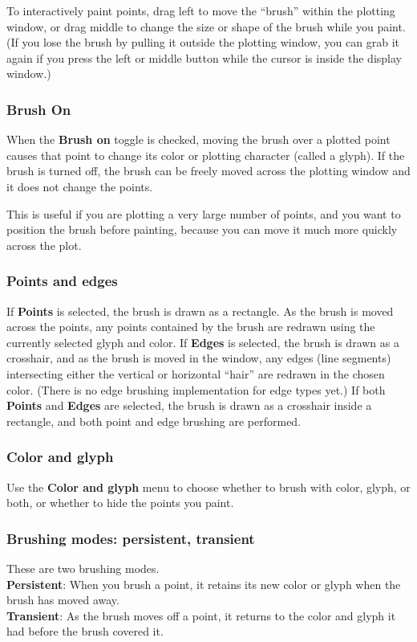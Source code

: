 \documentclass[11pt]{article}
\begin{document}
To interactively paint points, drag left to move the ``brush'' within
the plotting window, or drag middle to change the size or shape of
the brush while you paint.  (If you lose the brush by pulling it
outside the plotting window, you can grab it again if you press the
left or middle button while the cursor is inside the display window.)

\subsubsection{Brush On}
%
When the {\bf Brush on} toggle is checked, moving the brush
over a plotted point causes that point to change its color or
plotting character (called a glyph).  If the brush is turned off, the
brush can be freely moved across the plotting window and it does not
change the points.  

This is useful if you are plotting a very large number of points,
and you want to position the brush before painting, because you
can move it much more quickly across the plot.  

\subsubsection{Points and edges}
%
If {\bf Points} is selected, the brush is drawn as a rectangle.  As
the brush is moved across the points, any points contained by the
brush are redrawn using the currently selected glyph and color.  If
{\bf Edges} is selected, the brush is drawn as a crosshair, and as
the brush is moved in the window, any edges (line segments)
intersecting either the vertical or horizontal ``hair'' are redrawn
in the chosen color.  (There is no edge brushing implementation for
edge types yet.) If both {\bf Points} and {\bf Edges} are selected,
the brush is drawn as a crosshair inside a rectangle, and both point
and edge brushing are performed.

\subsubsection{Color and glyph}
%
Use the {\bf Color and glyph} menu to choose whether to brush
with color, glyph, or both, or whether to hide the points you
paint.

\subsubsection{Brushing modes:  persistent, transient}
%
These are two brushing modes.
\medskip
\noindent
\\{\bf Persistent}:  When you brush a point, it retains its new color or glyph
  when the brush has moved away.
\\{\bf Transient}:  As the brush moves off a point, it returns to the color and
  glyph it had before the brush covered it.
\end{document}

